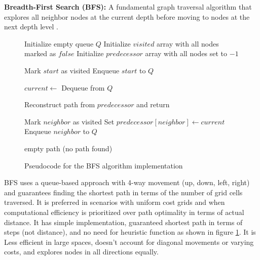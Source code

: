 \documentclass{CSSRforAfrica}
\begin{document}
\noindent \textbf{Breadth-First Search (BFS):} A fundamental graph traversal algorithm that explores all neighbor nodes at the current depth before moving to nodes at the next depth level \cite{cormen2009introduction}. 
\begin{figure}[H]
	\centering
	\begin{minipage}{0.8\textwidth}
		\begin{algorithm}[H]
			\caption{Breadth-First Search (BFS)}
			\begin{algorithmic}[1]
				\State Initialize empty queue $Q$
				\State Initialize $visited$ array with all nodes marked as $false$
				\State Initialize $predecessor$ array with all nodes set to $-1$
				
				\State Mark $start$ as visited
				\State Enqueue $start$ to $Q$
				
				\State $current \gets$ Dequeue from $Q$
				
				\State Reconstruct path from $predecessor$ and return
				\EndIf
				
				\State Mark $neighbor$ as visited
				\State Set $predecessor[neighbor] \gets current$
				\State Enqueue $neighbor$ to $Q$
				\EndIf
				\EndFor
				\EndWhile
				
				\State \Return empty path (no path found)
				\EndFunction
			\end{algorithmic}
		\end{algorithm}
	\end{minipage}
	\caption{Pseudocode for the BFS algorithm implementation}
	\label{alg:bfs}
\end{figure}


\noindent BFS uses a queue-based approach with 4-way movement (up, down, left, right) and guarantees finding the shortest path in terms of the number of grid cells traversed. It is preferred in scenarios with uniform cost grids and when computational efficiency is prioritized over path optimality in terms of actual distance. It has simple implementation, guaranteed shortest path in terms of steps (not distance), and no need for heuristic function as shown in figure \ref{alg:bfs}. It is Less efficient in large spaces, doesn't account for diagonal movements or varying costs, and explores nodes in all directions equally.\\
\end{document}
